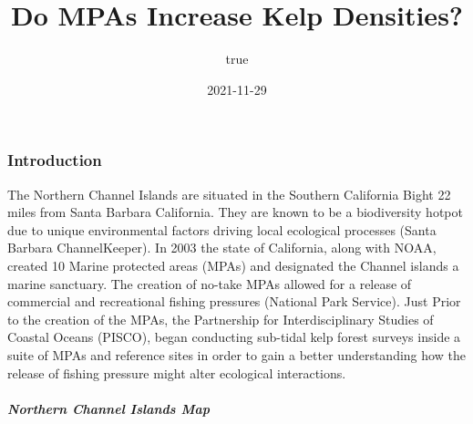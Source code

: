 \documentclass[
]{article}
\title{Do MPAs Increase Kelp Densities?}
\author{true}
\date{2021-11-29}
\begin{document}
\maketitle

{
\setcounter{tocdepth}{2}
\tableofcontents
}
\hypertarget{introduction}{%
\subsubsection{Introduction}\label{introduction}}

The Northern Channel Islands are situated in the Southern California
Bight 22 miles from Santa Barbara California. They are known to be a
biodiversity hotpot due to unique environmental factors driving local
ecological processes (Santa Barbara ChannelKeeper). In 2003 the state of
California, along with NOAA, created 10 Marine protected areas (MPAs)
and designated the Channel islands a marine sanctuary. The creation of
no-take MPAs allowed for a release of commercial and recreational
fishing pressures (National Park Service). Just Prior to the creation of
the MPAs, the Partnership for Interdisciplinary Studies of Coastal
Oceans (PISCO), began conducting sub-tidal kelp forest surveys inside a
suite of MPAs and reference sites in order to gain a better
understanding how the release of fishing pressure might alter ecological
interactions.

\hypertarget{northern-channel-islands-map}{%
\subparagraph{Northern Channel Islands
Map}\label{northern-channel-islands-map}}
\end{document}
